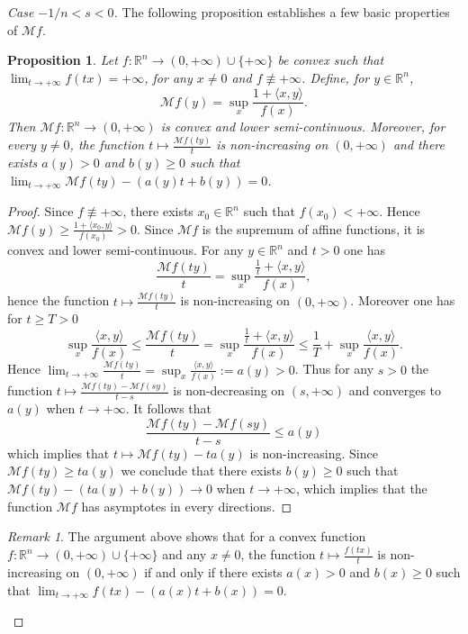 \documentclass[10pt]{amsart}
\newtheorem{prop}[thm]{Proposition}
\theoremstyle{definition}
\theoremstyle{remark}
\newtheorem{rem}[thm]{Remark}
\newcommand{\R}{\mathbb{R}}
\newcommand{\M}{\mathcal{M}}
\begin{document}
\begin{proof}[Case $-1/n<s< 0$]
The following proposition establishes a few basic properties of $\M f$.
\begin{prop}\label{prop:Mf} 
Let $f:\R^n\to(0,+\infty)\cup\{+\infty\}$ be convex 
such that $\lim_{t\to+\infty}f(tx)=+\infty$, for any $x\neq0$ and $f\not\equiv+\infty$. Define, for $y\in\R^n$,
\[
\M f(y)=\sup_x\frac{1+\langle x,y\rangle}{f(x)}.
\]
Then $\M f:\R^n\to (0,+\infty)$ is convex and lower semi-continuous. Moreover, for every $y\neq0$, the function $t\mapsto\frac{\M f(ty)}{t}$ is non-increasing on $(0,+\infty)$ and there exists $a(y)>0$ and $b(y)\ge0$ such that $\lim_{t\to+\infty}\M f(ty)-(a(y)t+b(y))=0$.
\end{prop}
\begin{proof}
Since $f\not\equiv+\infty$, there exists $x_0\in\R^n$ such that $f(x_0)<+\infty$. Hence $\M f(y)\ge \frac{1+\langle x_0,y\rangle}{f(x_0)}>0$.
Since $\M f$ is the supremum of affine functions, it is convex and lower semi-continuous. For any $y\in\R^n$ and $t>0$ one has 
\[
\frac{\M f(ty)}{t}=\sup_x\frac{\frac{1}{t}+\langle x,y\rangle}{f(x)},
\]
hence the function $t\mapsto\frac{\M f(ty)}{t}$ is non-increasing on $(0,+\infty)$. Moreover one has for $t\ge T>0$
\[
\sup_x\frac{\langle x,y\rangle}{f(x)}\le \frac{\M f(ty)}{t}=\sup_x\frac{\frac{1}{t}+\langle x,y\rangle}{f(x)}\le\frac{1}{T}+\sup_x\frac{\langle x,y\rangle}{f(x)}.
\]
Hence $\lim_{t\to+\infty}\frac{\M f(ty)}{t}=\sup_x\frac{\langle x,y\rangle}{f(x)}:=a(y)>0$. Thus for any $s>0$ the function $t\mapsto\frac{\M f(ty)-\M f(sy)}{t-s}$ is non-decreasing on $(s,+\infty)$ and converges to $a(y)$ when $t\to +\infty$. It follows that 
\[
\frac{\M f(ty)-\M f(sy)}{t-s}\le a(y)
\] 
which implies that $t\mapsto \M f(ty)- ta(y)$ is non-increasing. Since $\M f(ty)\ge ta(y)$ we conclude that there exists $b(y)\ge0$ such that $\M f(ty)-(ta(y)+b(y))\to0$ when $t\to+\infty$, which implies that the function $\M f$ has asymptotes in every directions.
\end{proof}
\begin{rem}\label{rk:var-rate}
The argument above shows that for a convex function $f:\R^n\to(0,+\infty)\cup\{+\infty\}$ and any $x\neq0$, the function $t\mapsto\frac{f(tx)}{t}$ is non-increasing on $(0,+\infty)$ if and only if there exists $a(x)>0$ and $b(x)\ge0$ such that $\lim_{t\to+\infty} f(tx)-(a(x)t+b(x))=0$.
\end{rem}


\end{proof}
\end{document}
